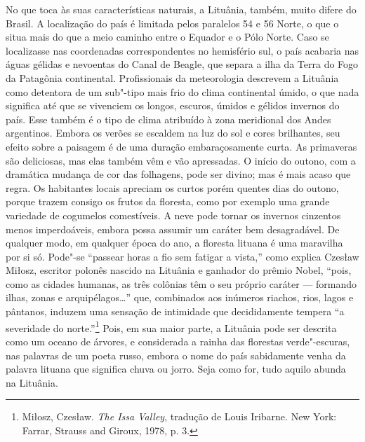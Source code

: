 No que toca às suas características naturais, a Lituânia, também, muito
difere do Brasil. A localização do país é limitada pelos paralelos 54 e
56 Norte, o que o situa mais do que a meio caminho entre o Equador e o
Pólo Norte. Caso se localizasse nas coordenadas correspondentes no
hemisfério sul, o país acabaria nas águas gélidas e nevoentas do Canal
de Beagle, que separa a ilha da Terra do Fogo da Patagônia continental.
Profissionais da meteorologia descrevem a Lituânia como detentora de um
sub"-tipo mais frio do clima continental úmido, o que nada significa até
que se vivenciem os longos, escuros, úmidos e gélidos invernos do país.
Esse também é o tipo de clima atribuído à zona meridional dos Andes
argentinos. Embora os verões se escaldem na luz do sol e cores
brilhantes, seu efeito sobre a paisagem é de uma duração embaraçosamente
curta. As primaveras são deliciosas, mas elas também vêm e vão
apressadas. O início do outono, com a dramática mudança de cor das
folhagens, pode ser divino; mas é mais acaso que regra. Os habitantes
locais apreciam os curtos porém quentes dias do outono, porque trazem
consigo os frutos da floresta, como por exemplo uma grande variedade de
cogumelos comestíveis. A neve pode tornar os invernos cinzentos menos
imperdoáveis, embora possa assumir um caráter bem desagradável. De
qualquer modo, em qualquer época do ano, a floresta lituana é uma
maravilha por si só. Pode"-se ``passear horas a fio sem fatigar a
vista,'' como explica Czesław Miłosz, escritor polonês nascido na
Lituânia e ganhador do prêmio Nobel, ``pois, como as cidades humanas, as
três colônias têm o seu próprio caráter --- formando ilhas, zonas e
arquipélagos\ldots{}'' que, combinados aos inúmeros riachos, rios, lagos
e pântanos, induzem uma sensação de intimidade que decididamente tempera
``a severidade do norte.''\footnote{Miłosz, Czesław. \emph{The Issa
  Valley}, tradução de Louis Iribarne. New York: Farrar, Strauss and
  Giroux, 1978, p. 3.} Pois, em sua maior parte, a Lituânia pode ser
descrita como um oceano de árvores, e considerada a rainha das florestas
verde"-escuras, nas palavras de um poeta russo, embora o nome do país
sabidamente venha da palavra lituana que significa chuva ou jorro. Seja
como for, tudo aquilo abunda na Lituânia.

